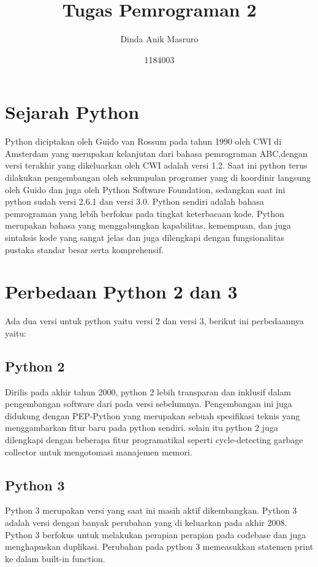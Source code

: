 \documentclass{article}
\title{Tugas Pemrograman 2}
\author{Dinda Anik Masruro }
\date{1184003}
\begin{document}
\maketitle

\section{Sejarah Python}
\hspace{1cm}Python diciptakan oleh Guido van Rossum pada tahun 1990 oleh CWI di Amsterdam yang merupakan kelanjutan dari bahasa pemrograman ABC,dengan versi terakhir yang dikeluarkan oleh CWI adalah versi 1.2. Saat ini python terus dilakukan pengembangan oleh sekumpulan programer yang di koordinir langsung oleh Guido dan juga oleh Python Software Foundation, sedangkan saat ini python sudah versi 2.6.1 dan versi 3.0. Python sendiri adalah bahasa pemrograman yang lebih berfokus pada tingkat keterbacaan kode. Python merupakan bahasa yang menggabungkan kapabilitas, kemempuan, dan juga sintaksis kode yang sangat jelas dan juga dilengkapi dengan fungsionalitas pustaka standar besar serta komprehensif.

\section{Perbedaan Python 2 dan 3}

Ada dua versi untuk python yaitu versi 2 dan versi 3, berikut ini perbedaannya yaitu:
\subsection{Python 2}
\hspace{1cm}Dirilis pada akhir tahun 2000, python 2 lebih transparan dan inklusif dalam pengembangan software dari pada versi sebelumnya. Pengembangan ini juga didukung dengan PEP-Python yang merupakan sebuah spesifikasi teknis yang menggambarkan fitur baru pada python sendiri. selain itu python 2 juga dilengkapi dengan beberapa fitur programatikal seperti cycle-detecting garbage collector untuk mengotomasi manajemen memori.
\newpage
\subsection{Python 3}
\hspace{1cm}Python 3 merupakan versi yang saat ini masih aktif dikembangkan. Python 3 adalah versi dengan banyak perubahan yang di keluarkan pada akhir 2008. Python 3 berfokus untuk melakukan perapian perapian pada codebase dan juga menghapuskan duplikasi. Perubahan pada python 3 memeasukkan statemen print  ke dalam built-in function.
\end{document}
